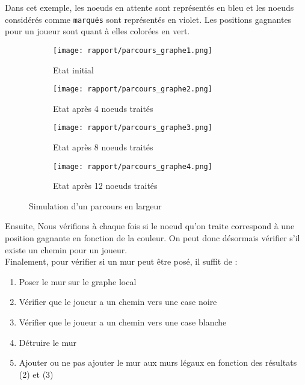 \documentclass[a4paper]{article}
\begin{document}
Dans cet exemple, les noeuds en attente sont représentés en bleu et les noeuds considérés comme \texttt{marqués} sont représentés en violet. Les positions gagnantes pour un joueur sont quant à elles colorées en vert. \\

\clearpage

\begin{figure}[ht]
    \centering
    \begin{subfigure}{.5\textwidth}
        \centering
        \texttt{[image: rapport/parcours\_graphe1.png]}
        \caption{Etat initial}
        \label{fig:parcours_graphe1}
    \end{subfigure}%
    \begin{subfigure}{.5\textwidth}
        \centering
        \texttt{[image: rapport/parcours\_graphe2.png]}
        \caption{Etat après 4 noeuds traités}
        \label{fig:parcours_graphe2}
    \end{subfigure}%
    
    
    
    \begin{subfigure}[b]{.5\textwidth}
        \centering
        \texttt{[image: rapport/parcours\_graphe3.png]}
        \caption{Etat après 8 noeuds traités}
        \label{fig:parcours_graphe3}
    \end{subfigure}%
    \begin{subfigure}[b]{.5\textwidth}
        \centering
        \texttt{[image: rapport/parcours\_graphe4.png]}
        \caption{Etat après 12 noeuds traités}
        \label{fig:parcours_graphe4}
    \end{subfigure}%

    \caption{Simulation d'un parcours en largeur}
    \label{fig:parcours_graphe}
\end{figure}




Ensuite, Nous vérifions à chaque fois si le noeud qu'on traite correspond à une position gagnante en fonction de la couleur. On peut donc désormais vérifier s'il existe un chemin pour un joueur. \\

Finalement, pour vérifier si un mur peut être posé, il suffit de :
\begin{enumerate}
    \item Poser le mur sur le graphe local
    \item Vérifier que le joueur  a un chemin vers une case noire
    \item Vérifier que le joueur  a un chemin vers une case blanche
    \item Détruire le mur
    \item Ajouter ou ne pas ajouter le mur aux murs légaux en fonction des résultats (2) et (3) \\
\end{enumerate}
\end{document}
